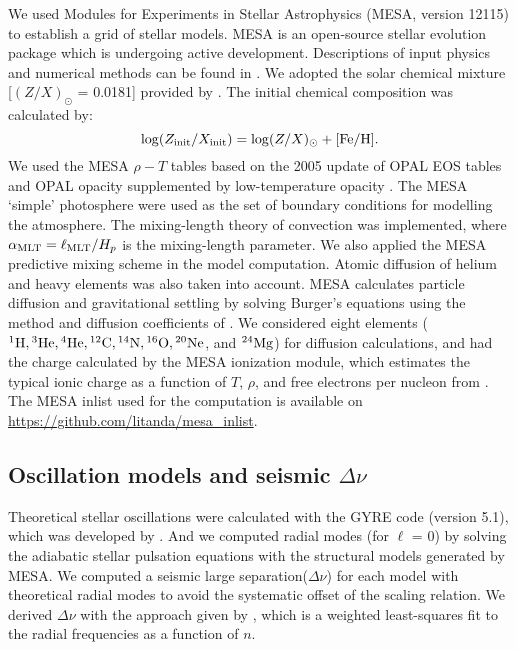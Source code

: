 We used Modules for Experiments in Stellar Astrophysics
(\textsc{MESA}, version 12115) to establish a grid of stellar models. 
\textsc{MESA} is an open-source stellar evolution package which is undergoing active development. Descriptions of input physics and numerical methods
can be found in \citet{2011ApJS..192....3P,2013ApJS..208....4P, 2015ApJS..220...15P}.
We adopted the solar chemical mixture [$(Z/X)_{\odot}$ = 0.0181]
provided by \citet{2009ARA&A..47..481A}. 
The initial chemical composition was calculated by: 
\begin{equation}
\log (Z_{\rm{init}}/X_{\rm{init}}) = \log (Z/X)_{\odot} + \rm{[Fe/H]}.  \\
\end{equation}
We used the \textsc{MESA} $\rho-T$ tables based on the 2005
update of OPAL EOS tables \citep{2002ApJ...576.1064R} and OPAL opacity
supplemented by low-temperature opacity \citep{2005ApJ...623..585F}. 
The MESA ‘simple’ photosphere were used as the set of boundary conditions for modelling the atmosphere.
The mixing-length theory of convection was implemented, where 
$\alpha_{\rm MLT} = \ell_{\rm MLT}/H_p$ is the mixing-length parameter.
We also applied the \textsc{MESA} predictive mixing scheme \citep{2018ApJS..234...34P,2019ApJS..243...10P}  in the model computation. 
Atomic diffusion of helium and 
heavy elements was also taken into account. MESA calculates particle diffusion and gravitational settling by solving Burger's equations using the method
and diffusion coefficients of \citet{Thoul94}. 
We considered eight elements (${}^1{\rm H}, {}^3{\rm He}, {}^4{\rm He}, {}^{12}{\rm C}, {}^{14}{\rm N}, {}^{16}{\rm O}, {}^{20}{\rm Ne}$, and ${}^{24}{\rm Mg}$)
for diffusion calculations, and had the charge calculated by the MESA ionization module, which estimates the typical ionic charge as a function of $T$, $\rho$, and free electrons per nucleon from \citet{Paquette1986}.
The \textsc{MESA} inlist used for the computation is available on \url{https://github.com/litanda/mesa_inlist}.  

\subsection{Oscillation models and seismic $\Delta \nu$}\label{subsec:seismo_model}

Theoretical stellar oscillations were calculated with the \textsc{GYRE} code (version 5.1), which was developed by \citet{2013MNRAS.435.3406T}. And we computed radial modes (for $\ell$ = 0) by solving the adiabatic stellar pulsation equations with the structural models generated by \textsc{MESA}. We computed a seismic large separation($\Delta \nu$) for each model with theoretical radial modes to avoid the systematic offset of the scaling relation. We derived $\Delta \nu$ with the approach given by \citet{2011ApJ...743..161W}, which is a weighted least-squares fit to the radial frequencies as a function of $n$.  


